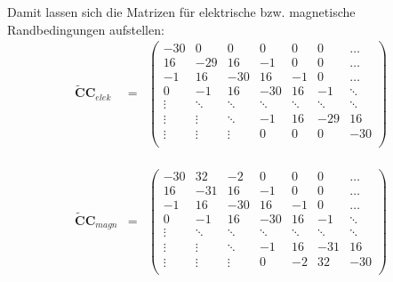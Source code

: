 \documentclass[Protokollheft.tex]{subfiles}
\begin{document}
	Damit lassen sich die Matrizen für elektrische bzw. magnetische Randbedingungen aufstellen:
	\begin{eqnarray*}
		\mathbf{\widetilde{C}C}_{elek}&=&\begin{pmatrix} -30 & 0 & 0 & 0 & 0 & 0 & \dots \\ 
			16 & -29 & 16 & -1 & 0 & 0 & \dots\\ 
			-1 & 16 & -30 & 16 & -1 & 0 & \dots\\ 
			0 & -1 & 16 & -30 & 16 & -1 & \ddots\\ 
			\vdots & \ddots & \ddots & \ddots & \ddots & \ddots & \ddots\\
			\vdots & \vdots & \ddots & -1 & 16 & -29 & 16\\
			\vdots & \vdots & \vdots & 0 & 0 & 0 & -30\\
		\end{pmatrix}
		\\
		\\
		\\
		\\
		\mathbf{\widetilde{C}C}_{magn}&=&\begin{pmatrix} -30 & 32 & -2 & 0 & 0 & 0 & \dots \\ 
			16 & -31 & 16 & -1 & 0 & 0 & \dots\\ 
			-1 & 16 & -30 & 16 & -1 & 0 & \dots\\ 
			0 & -1 & 16 & -30 & 16 & -1 & \ddots\\ 
			\vdots & \ddots & \ddots & \ddots & \ddots & \ddots & \ddots\\
			\vdots & \vdots & \ddots & -1 & 16 & -31 & 16\\
			\vdots & \vdots & \vdots & 0 & -2 & 32 & -30\\
		\end{pmatrix}
	\end{eqnarray*}
	
\end{document}
